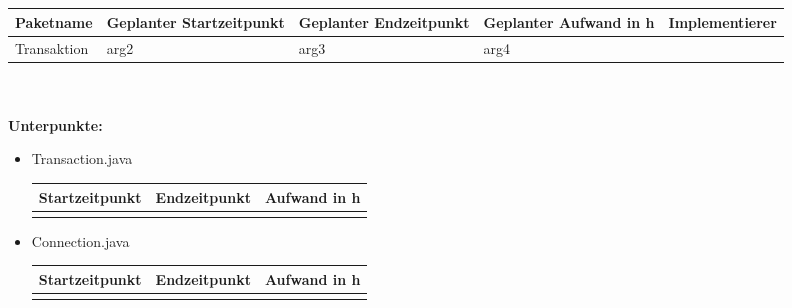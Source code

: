\documentclass[12pt,a4paper]{scrreprt}
\newcommand{\Arbeitspaket}[5]{	\begin{tabular}{|p{4cm}|p{3cm}|p{3cm}|p{3cm}|p{3cm}|}
		\hline \textbf{Paketname} & \textbf{Geplanter Startzeitpunkt} & \textbf{Geplanter Endzeitpunkt} & \textbf{Geplanter Aufwand in h} & \textbf{Implementierer} \\ 
		\hline #1 & #2  & #3 & #4 & #5 \\ 
		\hline 
	\end{tabular} \ \\
	\ \\}
\begin{document}
	\ \\
	\ \\
	\Arbeitspaket{Transaktion}{arg2}{arg3}{arg4}{}
	\textbf{Unterpunkte:}
		\begin{itemize}
			\item Transaction.java\\
			\begin{tabular}{|p{4cm}|p{4cm}|p{4cm}|}
				\hline Startzeitpunkt & Endzeitpunkt & Aufwand in h \\ 
				\hline &      &  \\ 
				\hline 
			\end{tabular}
			\item Connection.java	\\
			\begin{tabular}{|p{4cm}|p{4cm}|p{4cm}|}
				\hline Startzeitpunkt & Endzeitpunkt & Aufwand in h \\ 
				\hline &      &  \\ 
				\hline 
			\end{tabular}
		\end{itemize}
	
\end{document}

